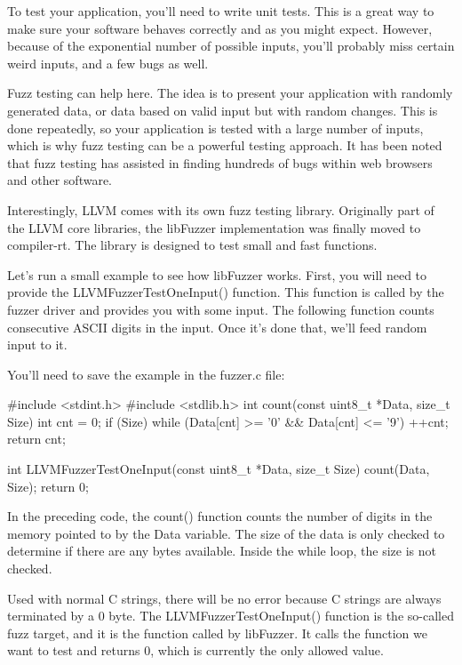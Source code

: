
To test your application, you’ll need to write unit tests. This is a great way to make sure your software behaves correctly and as you might expect. However, because of the exponential number of possible inputs, you’ll probably miss certain weird inputs, and a few bugs as well.

Fuzz testing can help here. The idea is to present your application with randomly generated data, or data based on valid input but with random changes. This is done repeatedly, so your application is tested with a large number of inputs, which is why fuzz testing can be a powerful testing approach. It has been noted that fuzz testing has assisted in finding hundreds of bugs within web browsers and other software.

Interestingly, LLVM comes with its own fuzz testing library. Originally part of the LLVM core libraries, the libFuzzer implementation was finally moved to compiler-rt. The library is designed to test small and fast functions.

Let’s run a small example to see how libFuzzer works. First, you will need to provide the LLVMFuzzerTestOneInput() function. This function is called by the fuzzer driver and provides you with some input. The following function counts consecutive ASCII digits in the input. Once it’s done that, we’ll feed random input to it.

You’ll need to save the example in the fuzzer.c file:

\begin{cpp}
#include <stdint.h>
#include <stdlib.h>
int count(const uint8_t *Data, size_t Size) {
    int cnt = 0;
    if (Size)
        while (Data[cnt] >= '0' && Data[cnt] <= '9') ++cnt;
    return cnt;
}

int LLVMFuzzerTestOneInput(const uint8_t *Data, size_t Size) {
    count(Data, Size);
    return 0;
}
\end{cpp}

In the preceding code, the count() function counts the number of digits in the memory pointed to by the Data variable. The size of the data is only checked to determine if there are any bytes available. Inside the while loop, the size is not checked.

Used with normal C strings, there will be no error because C strings are always terminated by a 0 byte. The LLVMFuzzerTestOneInput() function is the so-called fuzz target, and it is the function called by libFuzzer. It calls the function we want to test and returns 0, which is currently the only allowed value.

